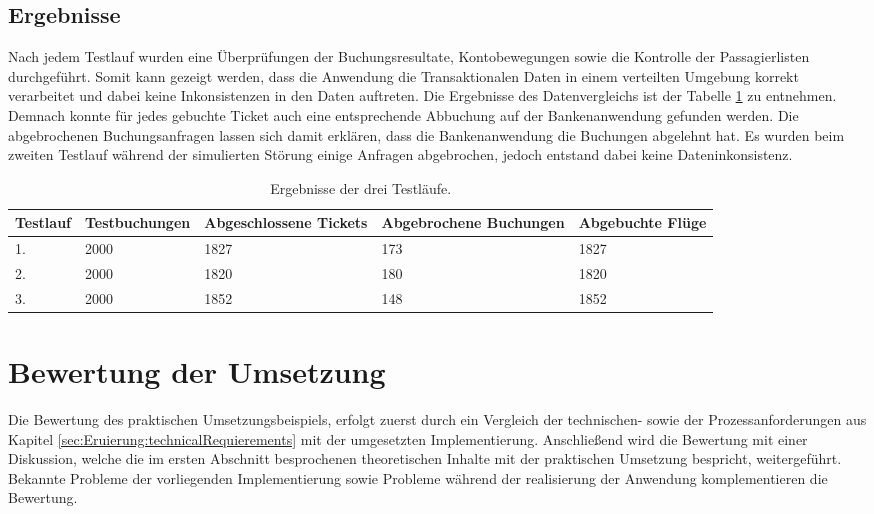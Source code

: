 \subsection{Ergebnisse}
\label{subsec:evaluation:resultsTestRuns}
Nach jedem Testlauf wurden eine Überprüfungen der Buchungsresultate, Kontobewegungen sowie die Kontrolle der Passagierlisten durchgeführt. Somit kann gezeigt werden, dass die Anwendung die Transaktionalen Daten in einem verteilten Umgebung korrekt verarbeitet und dabei keine Inkonsistenzen in den Daten auftreten. Die Ergebnisse des Datenvergleichs ist der Tabelle \ref{tab:evaluation:resultsTestRuns} zu entnehmen. Demnach konnte für jedes gebuchte Ticket auch eine entsprechende Abbuchung auf der Bankenanwendung gefunden werden. Die abgebrochenen Buchungsanfragen lassen sich damit erklären, dass die Bankenanwendung die Buchungen abgelehnt hat. Es wurden beim zweiten Testlauf während der simulierten Störung einige Anfragen abgebrochen, jedoch entstand dabei keine Dateninkonsistenz.
\begin{table}
    \centering
    \begin{tabular}{p{1.5 cm} p{2.5 cm} p{2.5 cm} p{2.5 cm} p{2.5 cm}}
        Testlauf    & Testbuchungen       &   Abgeschlossene Tickets & Abgebrochene Buchungen & Abgebuchte Flüge  \\ \hline
            1.      & 2000                &         1827             &      173               &         1827        \\
            2.      & 2000                &         1820             &      180               &         1820        \\
            3.      & 2000                &         1852             &      148               &         1852        
    \end{tabular}
    \caption{Ergebnisse der drei Testläufe.}
    \label{tab:evaluation:resultsTestRuns}
\end{table}

\section{Bewertung der Umsetzung}
\label{cha:rating}
Die Bewertung des praktischen Umsetzungsbeispiels, erfolgt zuerst durch ein Vergleich der technischen- sowie der Prozessanforderungen aus Kapitel \ref{sec:Eruierung:technicalRequierements} mit der umgesetzten Implementierung. Anschließend wird die Bewertung mit einer Diskussion, welche die im ersten Abschnitt besprochenen theoretischen Inhalte mit der praktischen Umsetzung bespricht, weitergeführt. Bekannte Probleme der vorliegenden Implementierung sowie Probleme während der realisierung der Anwendung komplementieren die Bewertung.

